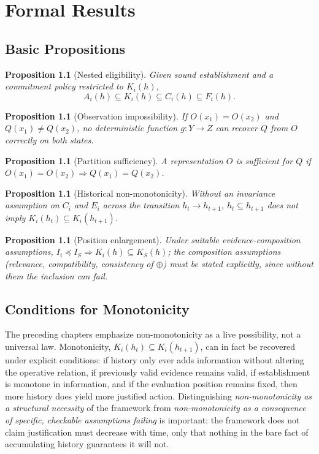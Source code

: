\documentclass[11pt]{report}
\theoremstyle{definition}
\theoremstyle{plain}
\newtheorem{proposition}[definition]{Proposition}
\begin{document}
\part{Formal Results}

\chapter{Basic Propositions}

\begin{proposition}[Nested eligibility]
Given sound establishment and a commitment policy restricted to $K_i(h)$,
\[
A_i(h) \subseteq K_i(h) \subseteq C_i(h) \subseteq F_i(h).
\]
\end{proposition}

\begin{proposition}[Observation impossibility]
If $O(x_1) = O(x_2)$ and $Q(x_1) \neq Q(x_2)$, no deterministic function $g: Y \to Z$ can recover $Q$ from $O$ correctly on both states.
\end{proposition}

\begin{proposition}[Partition sufficiency]
A representation $O$ is sufficient for $Q$ if $O(x_1) = O(x_2) \Rightarrow Q(x_1) = Q(x_2)$.
\end{proposition}

\begin{proposition}[Historical non-monotonicity]
Without an invariance assumption on $C_i$ and $E_i$ across the transition $h_t \to h_{t+1}$, $h_t \subseteq h_{t+1}$ does not imply $K_i(h_t) \subseteq K_i(h_{t+1})$.
\end{proposition}

\begin{proposition}[Position enlargement]
Under suitable evidence-composition assumptions, $I_i \preceq I_S \Rightarrow K_i(h) \subseteq K_S(h)$; the composition assumptions (relevance, compatibility, consistency of $\oplus$) must be stated explicitly, since without them the inclusion can fail.
\end{proposition}

\chapter{Conditions for Monotonicity}

The preceding chapters emphasize non-monotonicity as a live possibility, not a universal law. Monotonicity, $K_i(h_t) \subseteq K_i(h_{t+1})$, can in fact be recovered under explicit conditions: if history only ever adds information without altering the operative relation, if previously valid evidence remains valid, if establishment is monotone in information, and if the evaluation position remains fixed, then more history does yield more justified action. Distinguishing \emph{non-monotonicity as a structural necessity} of the framework from \emph{non-monotonicity as a consequence of specific, checkable assumptions failing} is important: the framework does not claim justification must decrease with time, only that nothing in the bare fact of accumulating history guarantees it will not.
\end{document}
